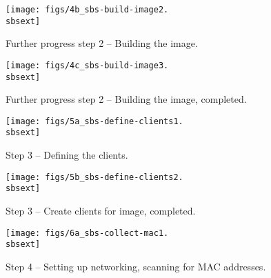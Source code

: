 \begin{figure}[htbp]
  \begin{center}
    \texttt{[image: figs/4b\_sbs-build-image2.\\sbsext]}
    \caption{Further progress step 2 -- Building the image.}
    \label{fig:sbs-build-image-progress}
  \end{center}
\end{figure}

\begin{figure}[htbp]
  \begin{center}
    \texttt{[image: figs/4c\_sbs-build-image3.\\sbsext]}
    \caption{Further progress step 2 -- Building the image, completed.}
    \label{fig:sbs-build-image2}
  \end{center}
\end{figure}

\begin{figure}[htbp]
  \begin{center}
    \texttt{[image: figs/5a\_sbs-define-clients1.\\sbsext]}
    \caption{Step 3 -- Defining the clients.}
    \label{fig:sbs-define-clients}
  \end{center}
\end{figure}

\begin{figure}[htbp]
  \begin{center}
    \texttt{[image: figs/5b\_sbs-define-clients2.\\sbsext]}
    \caption{Step 3 -- Create clients for image, completed.}
    \label{fig:sbs-define-clients2}
  \end{center}
\end{figure}


\begin{figure}[htbp]
  \begin{center}
    \texttt{[image: figs/6a\_sbs-collect-mac1.\\sbsext]}
    \caption{Step 4 -- Setting up networking, scanning for MAC addresses.}
    \label{fig:sbs-setup-network1}
  \end{center}
\end{figure}

